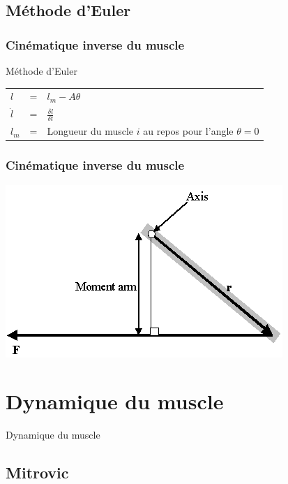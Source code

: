 \documentclass{beamer}
\begin{document}
\subsection{Méthode d'Euler}

\begin{frame}
\frametitle{Cinématique inverse du muscle}
Méthode d'Euler\\
\begin{tabular}{lcl}
    $l$       & = & $l_m - A \theta $ \\
    $\dot{l}$ & = & $\frac{\delta l}{\delta t}$ \\
    $l_{m}$   & = & Longueur du muscle $i$ au repos pour l'angle $\theta = 0$ \\
\end{tabular}
\end{frame}

\begin{frame}
\frametitle{Cinématique inverse du muscle}
\begin{center}
        \includegraphics[width=.50\linewidth]{fig/moment_arm}
\end{center}
\end{frame}
    

\section{Dynamique du muscle}
\begin{frame}
\begin{center}
{\LARGE Dynamique du muscle}
\end{center}
\end{frame}

\subsection{Mitrovic}
\end{document}
